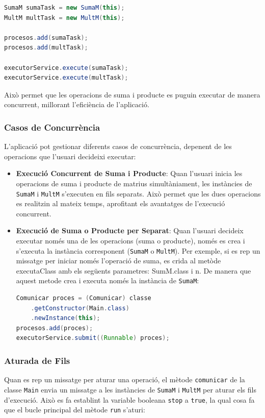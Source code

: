 \documentclass{ieeetj}
\begin{document}
\begin{lstlisting}[language=Java, basicstyle=\ttfamily\normalsize]
SumaM sumaTask = new SumaM(this);
MultM multTask = new MultM(this);

procesos.add(sumaTask);
procesos.add(multTask);

executorService.execute(sumaTask);
executorService.execute(multTask);
\end{lstlisting}

Això permet que les operacions de suma i producte es puguin executar de manera concurrent, millorant l'eficiència de l'aplicació.

\subsubsection{Casos de Concurrència}
L'aplicació pot gestionar diferents casos de concurrència, depenent de les operacions que l'usuari decideixi executar:

\begin{itemize}
    \item \textbf{Execució Concurrent de Suma i Producte}: Quan l'usuari inicia les operacions de suma i producte de matrius simultàniament, les instàncies de \texttt{SumaM} i \texttt{MultM} s'executen en fils separats. Això permet que les dues operacions es realitzin al mateix temps, aprofitant els avantatges de l'execució concurrent.
    \item \textbf{Execució de Suma o Producte per Separat}: Quan l'usuari decideix executar només una de les operacions (suma o producte), només es crea i s'executa la instància corresponent (\texttt{SumaM} o \texttt{MultM}). Per exemple, si es rep un missatge per iniciar només l'operació de suma, es crida al metòde executaClass amb els següents parametres: SumM.class i n. De manera que aquest metode  crea i executa només la instància de \texttt{SumaM}:

\begin{lstlisting}[language=Java, basicstyle=\ttfamily\normalsize]
Comunicar proces = (Comunicar) classe
    .getConstructor(Main.class)
    .newInstance(this);
procesos.add(proces);
executorService.submit((Runnable) proces);
\end{lstlisting}

\end{itemize}

\subsubsection{Aturada de Fils}
Quan es rep un missatge per aturar una operació, el mètode \texttt{comunicar} de la classe \texttt{Main} envia un missatge a les instàncies de \texttt{SumaM} i \texttt{MultM} per aturar els fils d'execució. Això es fa establint la variable booleana \texttt{stop} a \texttt{true}, la qual cosa fa que el bucle principal del mètode \texttt{run} s'aturi:
\end{document}

